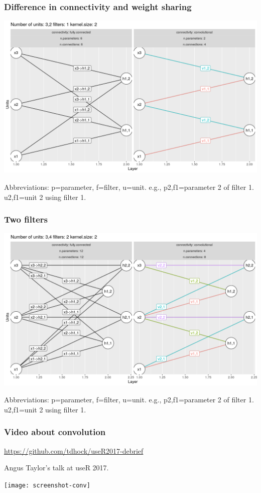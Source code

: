\documentclass{beamer}
\begin{document}
\begin{frame}
  \frametitle{Difference in connectivity and weight sharing}
  \includegraphics[width=\textwidth]{figure-convolutional-filters-3-2-1}

  Abbreviations: p=parameter, f=filter, u=unit.
  e.g., p2,f1=parameter 2 of filter 1. u2,f1=unit 2 using filter 1.
\end{frame}

\begin{frame}
  \frametitle{Two filters}
  \includegraphics[width=\textwidth]{figure-convolutional-filters-3-2-2}
  
  Abbreviations: p=parameter, f=filter, u=unit.
  e.g., p2,f1=parameter 2 of filter 1. u2,f1=unit 2 using filter 1.
\end{frame}

\begin{frame}
  \frametitle{Video about convolution}
  \url{https://github.com/tdhock/useR2017-debrief}

  Angus Taylor's talk at useR 2017.

  \texttt{[image: screenshot-conv]}
\end{frame}
\end{document}
